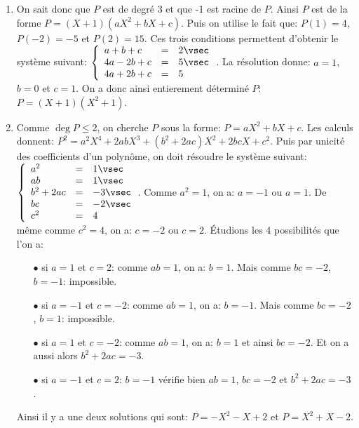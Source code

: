 \documentclass[a4paper, 11pt,reqno]{article}
\begin{document}
\begin{correction}
	\begin{enumerate}
		\item On sait donc que $P$ est de degr\'e 3 et que -1 est racine de $P$. Ainsi $P$ est de la forme $P=(X+1)(aX^2+bX+c)$. Puis on utilise le fait que: $P(1)=4$, $P(-2)=-5$ et $P(2)=15$. Ces trois conditions permettent d'obtenir le syst\`{e}me suivant: $\left\lbrace\begin{array}{lll}  a+b+c&=&2\vsec\\4a-2b+c&=&5\vsec\\4a+2b+c&=&5  \end{array}\right.$. La r\'esolution donne: $a=1$, $b=0$ et $c=1$. On a donc ainsi entierement d\'etermin\'e $P$: $P=(X+1)(X^2+1)$.
		\item Comme $\deg{P}\leq 2$, on cherche $P$ sous la forme: $P=aX^2+bX+c$. Les calculs donnent: $P^2=a^2X^4+2ab X^3+(b^2+2ac)X^2+2bcX+c^2$. Puis par unicit\'e des coefficients d'un polyn\^{o}me, on doit r\'esoudre le syst\`{e}me suivant: $\left\lbrace\begin{array}{lll}  a^2&=&1\vsec\\ab&=&1 \vsec\\b^2+2ac&=&-3\vsec\\ bc&=& -2\vsec\\c^2&=&4  \end{array}\right.$. Comme $a^2=1$, on a: $a=-1$ ou $a=1$. De m\^{e}me comme $c^2=4$, on a: $c=-2$ ou $c=2$. \'Etudions les 4 possibilit\'es que l'on a:
		      \begin{itemize}
			      \item[$\bullet$] si $a=1$ et $c=2$: comme $ab=1$, on a: $b=1$. Mais comme $bc=-2$, $b=-1$: impossible.
			      \item[$\bullet$] si $a=-1$ et $c=-2$: comme $ab=1$, on a: $b=-1$. Mais comme $bc=-2$, $b=1$: impossible.
			      \item[$\bullet$] si $a=1$ et $c=-2$: comme $ab=1$, on a: $b=1$ et ainsi $bc=-2$. Et on a aussi alors $b^2+2ac=-3.$
			      \item[$\bullet$] si $a=-1$ et $c=2$: $b=-1$ v\'erifie bien $ab=1$, $bc=-2$ et $b^2+2ac=-3$.
		      \end{itemize}
		      Ainsi il y a une deux solutions qui sont: $P=-X^2-X+2$ et $P=X^2+X-2$.
	\end{enumerate}
\end{correction}
\end{document}
